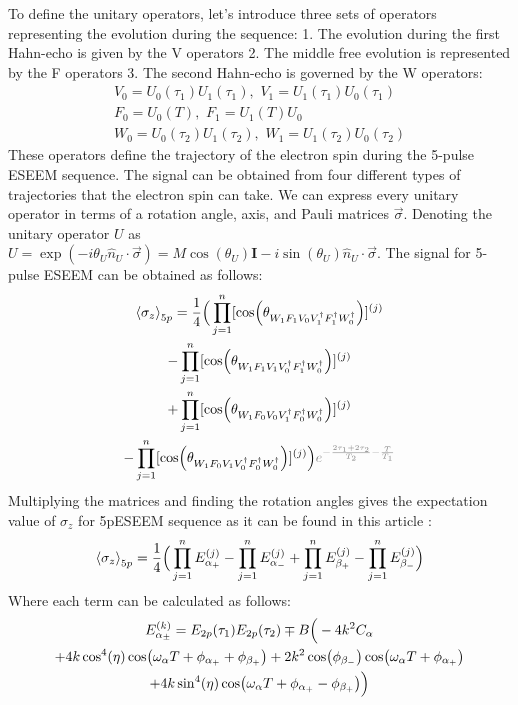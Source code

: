 \documentclass[%
 reprint,
superscriptaddress,
 amsmath,amssymb,
 aps,
]{revtex4-2}
\begin{document}
To define the unitary operators, let's introduce three sets of operators representing the evolution during the sequence:
1. The evolution during the first Hahn-echo is given by the 
V operators 2. The middle free evolution is represented by the 
F operators 3. The second Hahn-echo is governed by the W operators:
\begin{gather}
	V_0 = U_0 (\tau_1) U_1 (\tau_1),\,\,  V_1 = U_1 (\tau_1) U_0 (\tau_1) \\
	F_0 = U_0 (T), \,\, F_1 = U_1 (T) U_0 \\
	W_0 = U_0 (\tau_2) U_1 (\tau_2), \,\, W_1 = U_1 (\tau_2) U_0 (\tau_2)
\end{gather}
These operators define the trajectory of the electron spin during the 5-pulse ESEEM sequence.
The signal can be obtained from four different types of trajectories that the electron spin can take. We can express every unitary operator in terms of a rotation angle, axis, and Pauli matrices $\vec{\sigma}$. Denoting the unitary operator $U$ as $U = \exp(-i \theta_U \hat{n}_U\cdot\vec{\sigma}) = M\cos(\theta_U) \mathbf{I}- i \sin(\theta_U) \hat{n}_U\cdot\vec{\sigma}$. The signal for 5-pulse ESEEM can be obtained as follows:
\begin{gather}
		\expval{\sigma_z}_{5p} =\frac{1}{4}\Big( \prod_{j=1}^n [\cos(\theta_{W_1 F_1 V_0 V_1^\dagger F_1^\dagger W_0^\dagger})]^{(j)}  \notag \\
		-\prod_{j=1}^n [\cos(\theta_{W_1 F_1 V_1 V_0^\dagger F_1^\dagger W_0^\dagger})]^{(j)}  \notag \\
		+ \prod_{j=1}^n [\cos(\theta_{W_1 F_0 V_0 V_1^\dagger F_0^\dagger W_0^\dagger})]^{(j)}  \notag \\
		-\prod_{j=1}^n [\cos(\theta_{W_1 F_0 V_1 V_0^\dagger F_0^\dagger W_0^\dagger})]^{(j)} \Big) \textcolor{gray}{e^{-\frac{2\tau_1+2\tau_2}{T_2}- \frac{T}{T_1}}}
\end{gather}
Multiplying the matrices and finding the rotation angles gives the expectation value of $\sigma_z$ for 5pESEEM sequence as it can be found in this article \cite{kasumaj20085}:
\begin{gather}
	\expval{\sigma_z}_{5p} = \frac{1}{4}\Big( \prod_{j=1}^n E_{\alpha_+}^{(j)} - \prod_{j=1}^n E_{\alpha_-}^{(j)} + \prod_{j=1}^n E_{\beta_+}^{(j)}- \prod_{j=1}^n E_{\beta_-}^{(j)}\Big)
\end{gather}
Where each term can be calculated as follows:
\small   
\begin{gather} 
	E_{\alpha_\pm}^{(k)} = E_{2p}(\tau_1) E_{2p}(\tau_2) \mp B \Big(-4k^2C_\alpha \notag \\
	+4k\cos^4(\eta) \cos(\omega_\alpha T + \phi_{\alpha_+} +\phi_{\beta_+}) 
	+2 k^2 \cos(\phi_{\beta_-}) \cos(\omega_\alpha T+\phi_{\alpha_+}) \notag \\
	+ 4k \sin^4(\eta) \cos(\omega_\alpha T +\phi_{\alpha_+} -\phi_{\beta_+} )\Big)
	\label{eq:eseem}
\end{gather}
\end{document}
